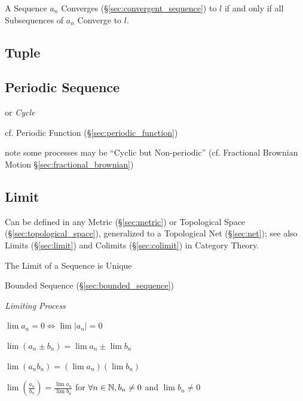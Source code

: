 A Sequence $a_n$ Converges (\S\ref{sec:convergent_sequence}) to $l$
if and only if all Subsequences of $a_n$ Converge to $l$.



\subsection{Tuple}\label{sec:tuple}

\subsection{Periodic Sequence}\label{sec:periodic_sequence}

or \emph{Cycle}

\fist cf. Periodic Function (\S\ref{sec:periodic_function})

note some processes may be ``Cyclic but Non-periodic'' (cf. Fractional Brownian
Motion \S\ref{sec:fractional_brownian})



\subsection{Limit}\label{sec:sequence_limit}

Can be defined in any Metric (\S\ref{sec:metric}) or Topological Space
(\S\ref{sec:topological_space}), generalized to a Topological Net
(\S\ref{sec:net}); see also Limits (\S\ref{sec:limit}) and Colimits
(\S\ref{sec:colimit}) in Category Theory.

The Limit of a Sequence is Unique

Bounded Sequence (\S\ref{sec:bounded_sequence})

\emph{Limiting Process}

$\lim a_n = 0 \Leftrightarrow \lim |a_n| = 0$

$\lim (a_n \pm b_n) = \lim a_n \pm \lim b_n$

$\lim (a_n b_n) = (\lim a_n) (\lim b_n)$

$\lim (\frac{a_n}{b_n}) = \frac{\lim a_n}{\lim b_n}$ for $\forall
n \in \mathbb{N}, b_n \neq 0$ and $\lim b_n \neq 0$

